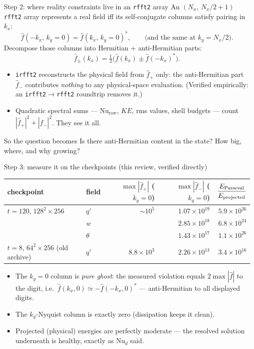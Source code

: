 \documentclass[aspectratio=169,10pt]{beamer}
\newcommand{\Nud}{\mathrm{Nu}_{d}}
\newcommand{\Nuraw}{\mathrm{Nu}_{\mathrm{raw}}}
\begin{document}
\begin{frame}{Step 2: where reality constraints live in an \texttt{rfft2} array}
  An $(N_x,\ N_x/2{+}1)$ \texttt{rfft2} array represents a real field iff its
  self-conjugate columns satisfy pairing in $k_x$:
  \[
    \hat f(-k_x,\,k_y{=}0) = \hat f(k_x,\,k_y{=}0)^{*},
    \qquad\text{(and the same at } k_y = N_x/2\text{)} .
  \]
  Decompose those columns into Hermitian + anti-Hermitian parts:
  \[
    \hat f_{\pm}(k_x) = \tfrac12\bigl(\hat f(k_x) \pm \hat f(-k_x)^{*}\bigr).
  \]
  \begin{itemize}
    \item \texttt{irfft2} reconstructs the physical field from $\hat f_{+}$ only:
      the anti-Hermitian part $\hat f_{-}$ contributes \emph{nothing} to any
      physical-space evaluation. (Verified empirically: an
      \texttt{irfft2}$\to$\texttt{rfft2} roundtrip removes it.)
    \item Quadratic spectral sums --- $\Nuraw$, $KE$, rms values, shell budgets ---
      count $|\hat f_{+}|^2 + |\hat f_{-}|^2$. They see it all.
  \end{itemize}
  \begin{block}{So the question becomes}
    Is there anti-Hermitian content in the state? How big, where, and why growing?
  \end{block}
\end{frame}

\begin{frame}{Step 3: measure it on the checkpoints (this review, verified directly)}
  \begin{center}
  \small
  \begin{tabular}{@{}llrrr@{}}
    \toprule
    checkpoint & field & $\max|\hat f_{+}|$ ($k_y{=}0$) & $\max|\hat f_{-}|$ ($k_y{=}0$) &
      $\dfrac{E_{\rm Parseval}}{E_{\rm projected}}$ \\
    \midrule
    $t{=}120$, $128^2{\times}256$ & $q'$ & $\sim10^{5}$ & $1.07\times10^{19}$ & $5.9\times10^{26}$ \\
     & $w$ & & $2.85\times10^{18}$ & $6.8\times10^{24}$ \\
     & $\theta$ & & $1.43\times10^{17}$ & $1.1\times10^{26}$ \\
    \midrule
    $t{=}8$, $64^2{\times}256$ (old archive) & $q'$ & $8.8\times10^{3}$ & $2.26\times10^{13}$ & $3.4\times10^{16}$ \\
    \bottomrule
  \end{tabular}
  \end{center}
  \begin{itemize}
    \item The $k_y{=}0$ column is \emph{pure ghost}: the measured violation equals
      $2\max|\hat f|$ to the digit, i.e.\ $\hat f(k_x,0) \simeq -\hat f(-k_x,0)^{*}$
      --- anti-Hermitian to all displayed digits.
    \item The $k_y$-Nyquist column is exactly zero (dissipation keeps it clean).
    \item Projected (physical) energies are perfectly moderate --- the resolved
      solution underneath is healthy, exactly as $\Nud$ said.
  \end{itemize}
\end{frame}
\end{document}
